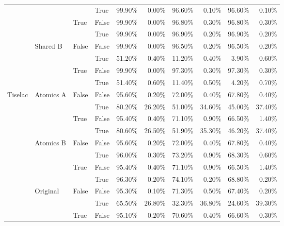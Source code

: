 \begin{table}[h]
\begin{tabular}{llllrrrrrr}
 &  &  & True & 99.90\% & 0.00\% & 96.60\% & 0.10\% & 96.60\% & 0.10\% \\
\cline{3-10}
 &  & \multirow[t]{2}{*}{True} & False & 99.90\% & 0.00\% & 96.80\% & 0.30\% & 96.80\% & 0.30\% \\
 &  &  & True & 99.90\% & 0.00\% & 96.90\% & 0.20\% & 96.90\% & 0.20\% \\
\cline{2-10} \cline{3-10}
 & \multirow[t]{4}{*}{Shared B} & \multirow[t]{2}{*}{False} & False & 99.90\% & 0.00\% & 96.50\% & 0.20\% & 96.50\% & 0.20\% \\
 &  &  & True & 51.20\% & 0.40\% & 11.20\% & 0.40\% & 3.90\% & 0.60\% \\
\cline{3-10}
 &  & \multirow[t]{2}{*}{True} & False & 99.90\% & 0.00\% & 97.30\% & 0.30\% & 97.30\% & 0.30\% \\
 &  &  & True & 51.40\% & 0.60\% & 11.40\% & 0.50\% & 4.20\% & 0.70\% \\
\cline{1-10} \cline{2-10} \cline{3-10}
\multirow[t]{20}{*}{Tiselac} & \multirow[t]{4}{*}{Atomics A} & \multirow[t]{2}{*}{False} & False & 95.60\% & 0.20\% & 72.00\% & 0.40\% & 67.80\% & 0.40\% \\
 &  &  & True & 80.20\% & 26.20\% & 51.00\% & 34.60\% & 45.00\% & 37.40\% \\
\cline{3-10}
 &  & \multirow[t]{2}{*}{True} & False & 95.40\% & 0.40\% & 71.10\% & 0.90\% & 66.50\% & 1.40\% \\
 &  &  & True & 80.60\% & 26.50\% & 51.90\% & 35.30\% & 46.20\% & 37.40\% \\
\cline{2-10} \cline{3-10}
 & \multirow[t]{4}{*}{Atomics B} & \multirow[t]{2}{*}{False} & False & 95.60\% & 0.20\% & 72.00\% & 0.40\% & 67.80\% & 0.40\% \\
 &  &  & True & 96.00\% & 0.30\% & 73.20\% & 0.90\% & 68.30\% & 0.60\% \\
\cline{3-10}
 &  & \multirow[t]{2}{*}{True} & False & 95.40\% & 0.40\% & 71.10\% & 0.90\% & 66.50\% & 1.40\% \\
 &  &  & True & 96.30\% & 0.20\% & 74.10\% & 0.20\% & 68.80\% & 0.20\% \\
\cline{2-10} \cline{3-10}
 & \multirow[t]{4}{*}{Original} & \multirow[t]{2}{*}{False} & False & 95.30\% & 0.10\% & 71.30\% & 0.50\% & 67.40\% & 0.20\% \\
 &  &  & True & 65.50\% & 26.80\% & 32.30\% & 36.80\% & 24.60\% & 39.30\% \\
\cline{3-10}
 &  & \multirow[t]{2}{*}{True} & False & 95.10\% & 0.20\% & 70.60\% & 0.40\% & 66.60\% & 0.30\% \\

\end{tabular}
\end{table}
